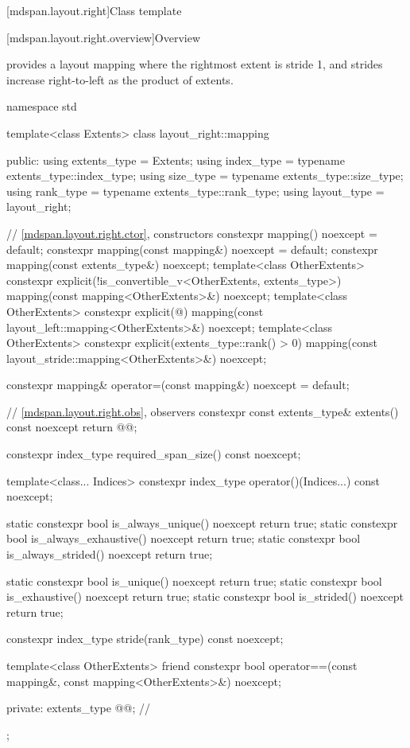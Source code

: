 [mdspan.layout.right]{Class template }

[mdspan.layout.right.overview]{Overview}

\pnum
{} provides a layout mapping
where the rightmost extent is stride 1, and
strides increase right-to-left as the product of extents.

\begin{codeblock}
namespace std {
  template<class Extents>
  class layout_right::mapping {
  public:
    using extents_type = Extents;
    using index_type = typename extents_type::index_type;
    using size_type = typename extents_type::size_type;
    using rank_type = typename extents_type::rank_type;
    using layout_type = layout_right;

    // \ref{mdspan.layout.right.ctor}, constructors
    constexpr mapping() noexcept = default;
    constexpr mapping(const mapping&) noexcept = default;
    constexpr mapping(const extents_type&) noexcept;
    template<class OtherExtents>
      constexpr explicit(!is_convertible_v<OtherExtents, extents_type>)
        mapping(const mapping<OtherExtents>&) noexcept;
    template<class OtherExtents>
      constexpr explicit(@\seebelow@)
        mapping(const layout_left::mapping<OtherExtents>&) noexcept;
    template<class OtherExtents>
      constexpr explicit(extents_type::rank() > 0)
        mapping(const layout_stride::mapping<OtherExtents>&) noexcept;

    constexpr mapping& operator=(const mapping&) noexcept = default;

    // \ref{mdspan.layout.right.obs}, observers
    constexpr const extents_type& extents() const noexcept { return @@; }

    constexpr index_type required_span_size() const noexcept;

    template<class... Indices>
      constexpr index_type operator()(Indices...) const noexcept;

    static constexpr bool is_always_unique() noexcept { return true; }
    static constexpr bool is_always_exhaustive() noexcept { return true; }
    static constexpr bool is_always_strided() noexcept { return true; }

    static constexpr bool is_unique() noexcept { return true; }
    static constexpr bool is_exhaustive() noexcept { return true; }
    static constexpr bool is_strided() noexcept { return true; }

    constexpr index_type stride(rank_type) const noexcept;

    template<class OtherExtents>
      friend constexpr bool operator==(const mapping&, const mapping<OtherExtents>&) noexcept;

  private:
    extents_type @@{};    // \expos
  };
}
\end{codeblock}

